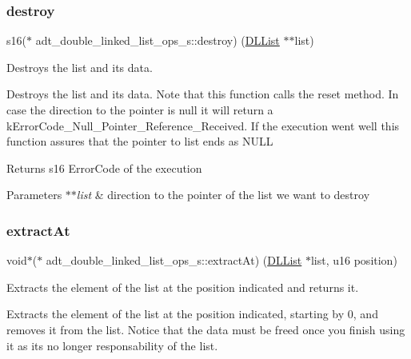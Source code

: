 \subsubsection{\texorpdfstring{destroy}{destroy}}
{\footnotesize\ttfamily s16($\ast$ adt\+\_\+double\+\_\+linked\+\_\+list\+\_\+ops\+\_\+s\+::destroy) (\hyperlink{structadt__double__linked__list__s}{D\+L\+List} $\ast$$\ast$list)}



Destroys the list and it\textquotesingle{}s data. 

Destroys the list and its data. Note that this function calls the reset method. In case the direction to the pointer is null it will return a k\+Error\+Code\+\_\+\+Null\+\_\+\+Pointer\+\_\+\+Reference\+\_\+\+Received. If the execution went well this function assures that the pointer to list ends as N\+U\+LL

\begin{DoxyReturn}{Returns}
s16 Error\+Code of the execution 
\end{DoxyReturn}

\begin{DoxyParams}{Parameters}
{\em $\ast$$\ast$list} & direction to the pointer of the list we want to destroy \\
\hline
\end{DoxyParams}
\mbox{\label{structadt__double__linked__list__ops__s_aa003cf5b1eadf08fc847b523c088084b}} 
\subsubsection{\texorpdfstring{extract\+At}{extractAt}}
{\footnotesize\ttfamily void$\ast$($\ast$ adt\+\_\+double\+\_\+linked\+\_\+list\+\_\+ops\+\_\+s\+::extract\+At) (\hyperlink{structadt__double__linked__list__s}{D\+L\+List} $\ast$list, u16 position)}



Extracts the element of the list at the position indicated and returns it. 

Extracts the element of the list at the position indicated, starting by 0, and removes it from the list. Notice that the data must be freed once you finish using it as it\textquotesingle{}s no longer responsability of the list.

